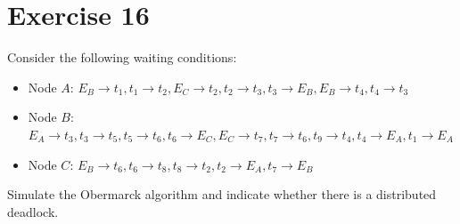 \section{Exercise 16}

Consider the following waiting conditions:
\begin{itemize}
    \item Node $A$: $E_B \rightarrow t_1, t_1 \rightarrow t_2, E_C \rightarrow t_2, t_2 \rightarrow t_3, t_3 \rightarrow E_B, E_B \rightarrow t_4, t_4 \rightarrow t_3$
    \item Node $B$: $E_A \rightarrow t_3, t_3 \rightarrow t_5, t_5 \rightarrow t_6, t_6 \rightarrow E_C, E_C \rightarrow t_7, t_7 \rightarrow t_6, t_9 \rightarrow t_4,t_4 \rightarrow E_A, t_1 \rightarrow E_A$
    \item Node $C$: $E_B \rightarrow t_6, t_6 \rightarrow t_8, t_8 \rightarrow t_2, t_2 \rightarrow E_A, t_7 \rightarrow E_B$
\end{itemize}
Simulate the Obermarck algorithm and indicate whether there is a distributed deadlock.
    
